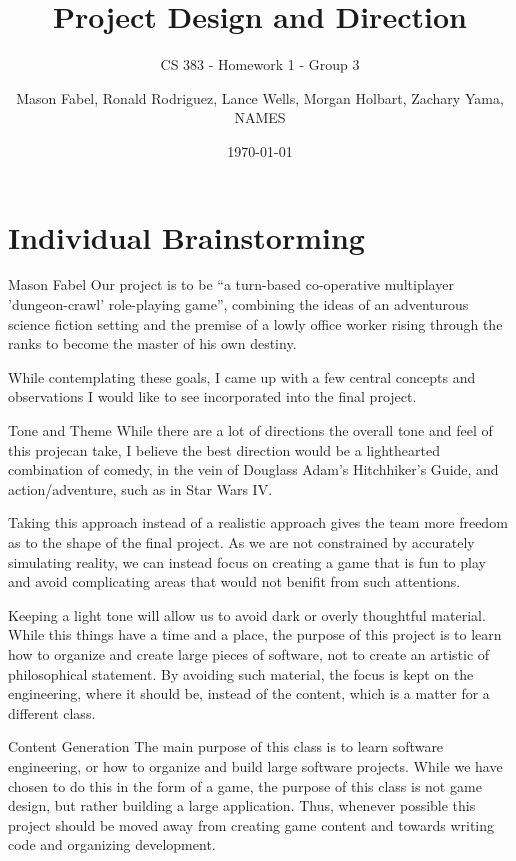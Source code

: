 \documentclass[12pt]{report}
\title{Project Design and Direction}
\subtitle{CS 383 - Homework 1 - Group 3}
\author{Mason Fabel, Ronald Rodriguez, Lance Wells, Morgan Holbart, Zachary Yama, NAMES} %
\date{\today}
\begin{document}
\maketitle

\chapter{Individual Brainstorming}


\begin{section}{Mason Fabel}
Our project is to be ``a turn-based co-operative multiplayer
'dungeon-crawl' role-playing game'', combining the ideas of an adventurous
science fiction setting and the premise of a lowly office worker rising
through the ranks to become the master of his own destiny.

While contemplating these goals, I came up with a few central concepts and
observations I would like to see incorporated into the final project.

\begin{subsection}{Tone and Theme}
While there are a lot of directions the overall tone and feel of this projecan take, I believe the best direction would be a lighthearted combination of comedy, in the vein of Douglass Adam's Hitchhiker's Guide, and
action/adventure, such as in Star Wars IV.

Taking this approach instead of a realistic approach gives the team more
freedom as to the shape of the final project. As we are not constrained by
accurately simulating reality, we can instead focus on creating a game that
is fun to play and avoid complicating areas that would not benifit from
such attentions.

Keeping a light tone will allow us to avoid dark or overly thoughtful
material. While this things have a time and a place, the purpose
of this project is to learn how to organize and create large pieces of
software, not to create an artistic of philosophical statement. By avoiding
such material, the focus is kept on the engineering, where it should be,
instead of the content, which is a matter for a different class.
\end{subsection}

\begin{subsection}{Content Generation}
The main purpose of this class is to learn software engineering, or how
to organize and build large software projects. While we have chosen to do
this in the form of a game, the purpose of this class is not game design,
but rather building a large application. Thus, whenever possible this
project should be moved away from creating game content and towards writing
code and organizing development.


\end{subsection}
\end{section}
\end{document}
